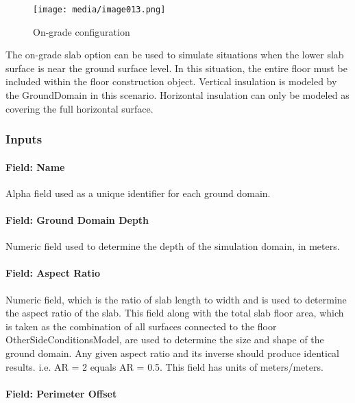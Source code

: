 \begin{figure}[htbp]
\centering
\texttt{[image: media/image013.png]}
\caption{On-grade configuration \protect \label{fig:on-grade-configuration}}
\end{figure}

The on-grade slab option can be used to simulate situations when the lower slab surface is near the ground surface level. In this situation, the entire floor must be included within the floor construction object. Vertical insulation is modeled by the GroundDomain in this scenario. Horizontal insulation can only be modeled as covering the full horizontal surface.

\subsubsection{Inputs}\label{inputs-16-006}

\paragraph{Field: Name}\label{field-name-8-009}

Alpha field used as a unique identifier for each ground domain.

\paragraph{Field: Ground Domain Depth}\label{field-ground-domain-depth}

Numeric field used to determine the depth of the simulation domain, in meters.

\paragraph{Field: Aspect Ratio}\label{field-aspect-ratio}

Numeric field, which is the ratio of slab length to width and is used to determine the aspect ratio of the slab. This field along with the total slab floor area, which is taken as the combination of all surfaces connected to the floor OtherSideConditionsModel, are used to determine the size and shape of the ground domain. Any given aspect ratio and its inverse should produce identical results. i.e. AR = 2 equals AR = 0.5. This field has units of meters/meters.

\paragraph{Field: Perimeter Offset}\label{field-perimeter-offset}

